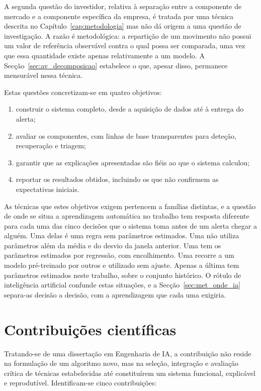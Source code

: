 A segunda questão do investidor, relativa à separação entre a componente de mercado e a componente
específica da empresa, é tratada por uma técnica descrita no Capítulo~\ref{cap:metodologia} mas não
dá origem a uma questão de investigação. A razão é metodológica: a repartição de um movimento não
possui um valor de referência observável contra o qual possa ser comparada, uma vez que essa
quantidade existe apenas relativamente a um modelo. A Secção~\ref{sec:av_decomposicao} estabelece
o que, apesar disso, permanece mensurável nessa técnica.

Estas questões concretizam-se em quatro objetivos:

\begin{enumerate}
  \item construir o sistema completo, desde a aquisição de dados até à entrega do alerta;
  \item avaliar os componentes, com linhas de base transparentes para deteção, recuperação e triagem;
  \item garantir que as explicações apresentadas são fiéis ao que o sistema calculou;
  \item reportar os resultados obtidos, incluindo os que não confirmem as expectativas iniciais.
\end{enumerate}

As técnicas que estes objetivos exigem pertencem a famílias distintas, e a questão de onde se
situa a aprendizagem automática no trabalho tem resposta diferente para cada uma das cinco
decisões que o sistema toma antes de um alerta chegar a alguém. Uma delas é uma regra sem
parâmetros estimados. Uma não utiliza parâmetros além da média e do desvio da janela anterior.
Uma tem os parâmetros estimados por regressão, com encolhimento. Uma recorre a um modelo
pré-treinado por outros e utilizado sem ajuste. Apenas a última tem parâmetros estimados neste
trabalho, sobre o conjunto histórico. O rótulo de inteligência artificial confunde estas
situações, e a Secção~\ref{sec:met_onde_ia} separa-as decisão a decisão, com a aprendizagem que
cada uma exigiria.

\section{Contribuições científicas}
\label{sec:intro_contribuicoes}

Tratando-se de uma dissertação em Engenharia de \gls{IA}, a contribuição não reside na formulação
de um algoritmo novo, mas na seleção, integração e avaliação crítica de técnicas estabelecidas até
constituírem um sistema funcional, explicável e reprodutível. Identificam-se cinco contribuições:


